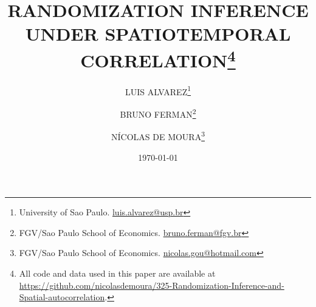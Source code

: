 \documentclass[letterpaper, 11pt]{article}
\begin{document}
\title{\normalsize\MakeUppercase{\bfseries 
 Randomization Inference under Spatiotemporal Correlation}\footnote{All code and data used in this paper are available at \url{https://github.com/nicolasdemoura/325-Randomization-Inference-and-Spatial-autocorrelation}.}}
\date{\footnotesize\MakeUppercase\today}
\author{
    \small\MakeUppercase{Luis Alvarez}\footnote{University of Sao Paulo. \href{mailto:luis.alvarez@usp.br}{luis.alvarez@usp.br}} \and
    \small\MakeUppercase{Bruno Ferman}\footnote{FGV/Sao Paulo School of Economics. \href{mailto:bruno.ferman@fgv.br}{bruno.ferman@fgv.br}} \and
    \small\MakeUppercase{Nícolas de Moura}\footnote{FGV/Sao Paulo School of Economics. \href{mailto:nicolas.gou@hotmail.com}{nicolas.gou@hotmail.com}}
}
\maketitle



\newpage






\newpage



\newpage

\newpage



\end{document}
